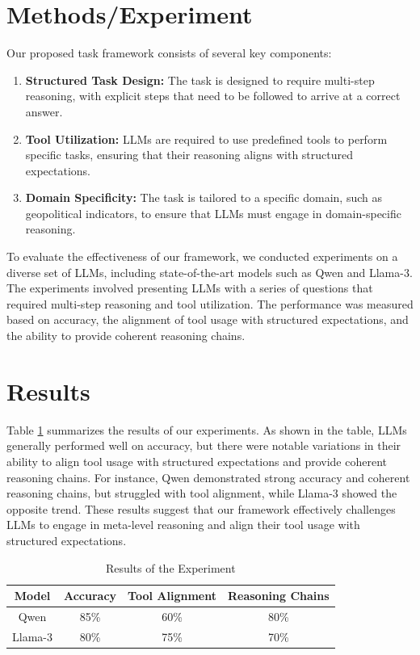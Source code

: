 \documentclass[12pt]{article}
\begin{document}
\section{Methods/Experiment}
Our proposed task framework consists of several key components:
\begin{enumerate}
    \item \textbf{Structured Task Design:} The task is designed to require multi-step reasoning, with explicit steps that need to be followed to arrive at a correct answer.
    \item \textbf{Tool Utilization:} LLMs are required to use predefined tools to perform specific tasks, ensuring that their reasoning aligns with structured expectations.
    \item \textbf{Domain Specificity:} The task is tailored to a specific domain, such as geopolitical indicators, to ensure that LLMs must engage in domain-specific reasoning.
\end{enumerate}

To evaluate the effectiveness of our framework, we conducted experiments on a diverse set of LLMs, including state-of-the-art models such as Qwen and Llama-3. The experiments involved presenting LLMs with a series of questions that required multi-step reasoning and tool utilization. The performance was measured based on accuracy, the alignment of tool usage with structured expectations, and the ability to provide coherent reasoning chains.

\section{Results}
Table \ref{tab:results} summarizes the results of our experiments. As shown in the table, LLMs generally performed well on accuracy, but there were notable variations in their ability to align tool usage with structured expectations and provide coherent reasoning chains. For instance, Qwen demonstrated strong accuracy and coherent reasoning chains, but struggled with tool alignment, while Llama-3 showed the opposite trend. These results suggest that our framework effectively challenges LLMs to engage in meta-level reasoning and align their tool usage with structured expectations.

\begin{table}[h]
\centering
\begin{tabular}{|c|c|c|c|}
\hline
\textbf{Model} & \textbf{Accuracy} & \textbf{Tool Alignment} & \textbf{Reasoning Chains} \\
\hline
Qwen & 85\% & 60\% & 80\% \\
Llama-3 & 80\% & 75\% & 70\% \\
\hline
\end{tabular}
\caption{Results of the Experiment}
\label{tab:results}
\end{table}
\end{document}
